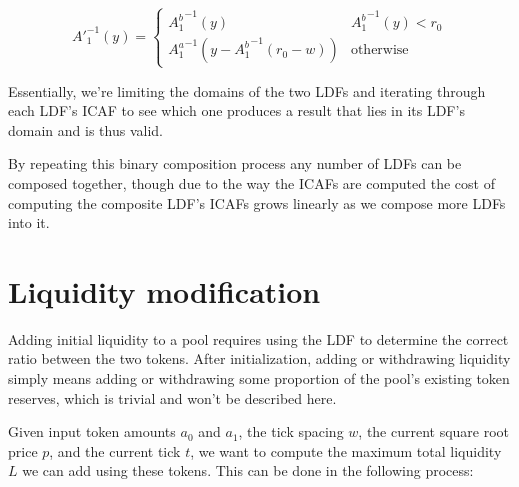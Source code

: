 \documentclass[twocolumn]{article}
\begin{document}
\begin{equation}
  A'^{-1}_1(y) =
    \begin{cases}
      {A_1^b}^{-1}(y) & {A_1^b}^{-1}(y) \lt r_0 \\
      {A_1^a}^{-1}(y - {A_1^b}^{-1}(r_0 - w)) & \text{otherwise}
    \end{cases}       
\end{equation}

Essentially, we're limiting the domains of the two LDFs and iterating through each LDF's ICAF to see which one produces a result that lies in its LDF's domain and is thus valid.

By repeating this binary composition process any number of LDFs can be composed together, though due to the way the ICAFs are computed the cost of computing the composite LDF's ICAFs grows linearly as we compose more LDFs into it.

\section{Liquidity modification}

Adding initial liquidity to a pool requires using the LDF to determine the correct ratio between the two tokens. After initialization, adding or withdrawing liquidity simply means adding or withdrawing some proportion of the pool's existing token reserves, which is trivial and won't be described here. 

Given input token amounts $a_0$ and $a_1$, the tick spacing $w$, the current square root price $p$, and the current tick $t$, we want to compute the maximum total liquidity $L$ we can add using these tokens. This can be done in the following process:
\end{document}
